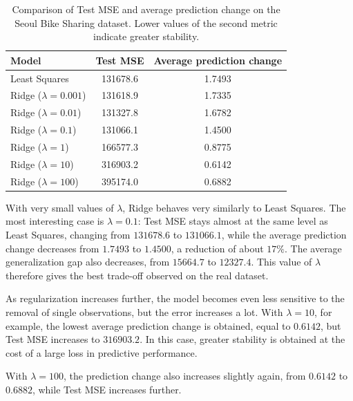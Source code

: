 \documentclass[11pt,a4paper]{article}
\begin{document}
\begin{table}[ht]
    \centering
    \begin{tabular}{lcc}
        \toprule
        Model & Test MSE & Average prediction change \\
        \midrule
        Least Squares & 131678.6 & 1.7493 \\
        Ridge ($\lambda=0.001$) & 131618.9 & 1.7335 \\
        Ridge ($\lambda=0.01$)  & 131327.8 & 1.6782 \\
        Ridge ($\lambda=0.1$)   & 131066.1 & 1.4500 \\
        Ridge ($\lambda=1$)     & 166577.3 & 0.8775 \\
        Ridge ($\lambda=10$)    & 316903.2 & 0.6142 \\
        Ridge ($\lambda=100$)   & 395174.0 & 0.6882 \\
        \bottomrule
    \end{tabular}
    \caption{Comparison of Test MSE and average prediction change on the Seoul Bike Sharing dataset. Lower values of the second metric indicate greater stability.}
    \label{tab:real-results}
\end{table}

With very small values of $\lambda$, Ridge behaves very similarly to Least Squares. The most interesting case is $\lambda=0.1$: Test MSE stays almost at the same level as Least Squares, changing from $131678.6$ to $131066.1$, while the average prediction change decreases from $1.7493$ to $1.4500$, a reduction of about $17\%$. The average generalization gap also decreases, from $15664.7$ to $12327.4$. This value of $\lambda$ therefore gives the best trade-off observed on the real dataset.

As regularization increases further, the model becomes even less sensitive to the removal of single observations, but the error increases a lot. With $\lambda=10$, for example, the lowest average prediction change is obtained, equal to $0.6142$, but Test MSE increases to $316903.2$. In this case, greater stability is obtained at the cost of a large loss in predictive performance.

With $\lambda=100$, the prediction change also increases slightly again, from $0.6142$ to $0.6882$, while Test MSE increases further.
\end{document}
